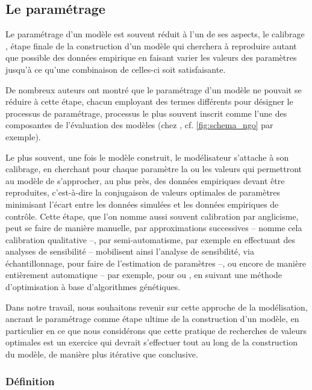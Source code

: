 \subsection{Le paramétrage}

Le paramétrage d'un modèle est souvent réduit à l'un de ses aspects, le \og calibrage \fg, étape finale de la construction d'un modèle qui cherchera à reproduire autant que possible des données empirique en faisant varier les valeurs des paramètres jusqu'à ce qu'une combinaison de celles-ci soit satisfaisante.

De nombreux auteurs ont montré que le paramétrage d'un modèle ne pouvait se réduire à cette étape, chacun employant des termes différents pour désigner le processus de paramétrage, processus le plus souvent inscrit comme l'une des composantes de l'évaluation des modèles (chez \textcite{ngo_calibration_2012}, cf. \cref{fig:schema_ngo} par exemple).

Le plus souvent, une fois le modèle construit, le modélisateur s'attache à son \og calibrage\fg{}, en cherchant pour chaque paramètre la ou les valeurs qui permettront au modèle de s'approcher, au plus près, des données empiriques devant être reproduites, c'est-à-dire la conjugaison de \og valeurs optimales\fg{} de paramètres minimisant l'écart entre les données simulées et les données empiriques de contrôle.
Cette étape, que l'on nomme aussi souvent calibration par anglicisme, peut se faire de manière manuelle, par approximations successives  -- \textcite[253]{crooks_agent-based_2019} nomme cela \og calibration qualitative\fg{} --, par semi-automatisme, par exemple en effectuant des analyses de sensibilité -- \textcite[\S2.3--2.4]{thiele_facilitating_2014} mobilisent ainsi l'analyse de sensibilité, via échantillonnage, pour faire de l'estimation de paramètres --, ou encore de manière entièrement automatique -- par exemple, pour \textcite{heppenstall_genetic_2007} ou \textcite[188]{ngo_calibration_2012}, en suivant une méthode d'optimisation à base d'\og{}algorithmes génétiques\fg{}.

Dans notre travail, nous souhaitons revenir sur cette approche de la modélisation, ancrant le paramétrage comme étape ultime de la construction d'un modèle, en particulier en ce que nous considérons que cette pratique de recherches de valeurs optimales est un exercice qui devrait s'effectuer tout au long de la construction du modèle, de manière plus itérative que conclusive.

\subsubsection{Définition \label{sssec:definition-parametrage}}

